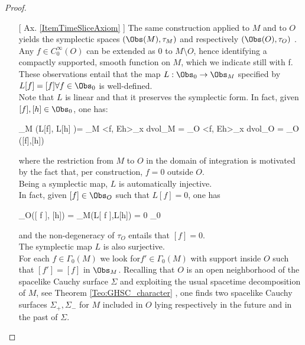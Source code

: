 \documentclass[Main]{subfiles}
\begin{document}
\begin{proof}
\begin{itemize}
						\item[[ Ax. \ref{ItemTimeSliceAxiom}]]
									The same construction applied to $M$ and to $O$ yields the symplectic spaces $(\Obs(M),\tau_M)$ and respectively $(\Obs(O),\tau_O)$ .
									Any $f\in C^\infty_0(O)$ can be extended as $0$ to $M\setminus O$, hence identifying a compactly supported, smooth function on $M$, which we indicate still with f.\\
									These observations entail that the map $L: \Obs_0 \rightarrow \Obs_M$ specified by $L [f]= [f] \forall f \in \Obs_0$ is well-defined.
								\vspace{2mm} \\ %
									Note that $L$ is linear and that it preserves the symplectic form. In fact, given $[ f ], [h] \in \Obs_0$, one has:
									\begin{compactdisplaymath}
										\tau_M \big(L[f], L[h] \big)= \int_M <f, Eh>_x d\textrm{vol}_M =
										 \int_O <f, Eh>_x d\textrm{vol}_O = \tau_O \big([f],[h]\big)
									\end{compactdisplaymath}
									where the restriction from $M$ to $O$ in the domain of integration is motivated by the fact that, per construction, $f = 0$ outside $O$.
								\vspace{2mm} \\ Being a symplectic map, $L$ is automatically injective. \\
									In fact, given $[ f ] \in \Obs_O$ such that $L[ f ] = 0$, one has
									\begin{compactdisplaymath}
										\tau_O([ f ], [h]) = \tau_M(L[ f ],L[h]) = 0 \qquad \forall \: [h] \in \Obs_0
									\end{compactdisplaymath}
									and the non-degeneracy of $\tau_O$ entails that $[ f ] = 0$.
								\vspace{2mm}\\  The symplectic map $L$ is also surjective.\\
									For each $f\in \Gamma_0(M)$ we look for$ f' \in \Gamma_0(M)$ with support inside $O$ such that $[f']=[f]$ in $\Obs_M$.
									Recalling that $O$ is an open neighborhood of the spacelike Cauchy surface $\Sigma$ and exploiting the usual spacetime decomposition of $M$, see Theorem \ref{Teo:GHSC_character} , one finds two spacelike Cauchy surfaces $\Sigma_+,\Sigma_-$ for $M$ included in $O$ lying respectively in the future and in the past of $\Sigma$.\\

\end{itemize}
\end{proof}
\end{document}
